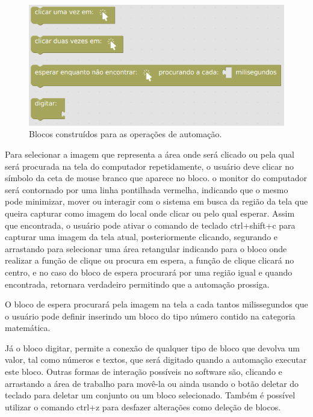 \documentclass[tg]{mdtufsm}
\begin{document}
                \begin{figure}[!htb]
                    {\centering
                    \includegraphics[width=1.0\textwidth]{imagens/blocks.png}
                    \caption{Blocos construídos para as operações de automação.}
                    \label{fig:myblocks}}
                \end{figure}

                Para selecionar a imagem que representa a área onde será clicado ou pela qual será procurada na tela do computador repetidamente, o usuário deve clicar no símbolo da ceta de mouse branco que aparece no bloco. o monitor do computador será contornado por uma linha pontilhada vermelha, indicando que o mesmo pode minimizar, mover ou interagir com o sistema em busca da região da tela que queira capturar como imagem do local onde clicar ou pelo qual esperar. Assim que encontrada, o usuário pode ativar o comando de teclado ctrl+shift+c para capturar uma imagem da tela atual, posteriormente clicando, segurando e arrastando para selecionar uma área retangular indicando para o bloco onde realizar a função de clique ou procura em espera, a função de clique clicará no centro, e no caso do bloco de espera procurará por uma região igual e quando encontrada, retornara verdadeiro permitindo que a automação prossiga.

                O bloco de espera procurará pela imagem na tela a cada tantos milissegundos que o usuário pode definir inserindo um bloco do tipo número contido na categoria matemática.

                Já o bloco digitar, permite a conexão de qualquer tipo de bloco que devolva um valor, tal como números e textos, que será digitado quando a automação executar este bloco.
                Outras formas de interação possíveis no software são, clicando e arrastando a área de trabalho para movê-la ou ainda usando o botão deletar do teclado para deletar um conjunto ou um bloco selecionado. Também é possível utilizar o comando ctrl+z para desfazer alterações como deleção de blocos.
\end{document}
